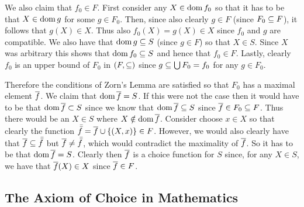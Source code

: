 \begin{questions}
{{      We also claim that $f_0 \in F$.
      First consider any $X \in \dom{f_0}$ so that it has to be that $X \in \dom{g}$ for some $g \in F_0$.
      Then, since also clearly $g \in F$ (since $F_0 \ss F$), it follows that $g(X) \in X$.
      Thus also $f_0(X) = g(X) \in X$ since $f_0$ and $g$ are compatible.
      We also have that $\dom{g} \ss S$ (since $g \in F$) so that $X \in S$.
      Since $X$ was arbitrary this shows that $\dom{f_0} \ss S$ and hence that $f_0 \in F$.
      Lastly, clearly $f_0$ is an upper bound of $F_0$ in $(F, \ss)$ since $g \ss \bigcup F_0 = f_0$ for any $g \in F_0$.

      Therefore the conditions of Zorn's Lemma are satisfied so that $F_0$ has a maximal element $\fb$.
      We claim that $\dom{\fb} = S$.
      If this were not the case then it would have to be that $\dom{\fb} \pss S$ since we know that $\dom{\fb} \ss S$ since $\fb \in F_0 \ss F$.
      Thus there would be an $X \in S$ where $X \notin \dom{\fb}$.
      Consider choose $x \in X$ so that clearly the function $\fbb = \fb \cup \braces{(X, x)} \in F$.
      However, we would also clearly have that $\fb \ss \fbb$ but $\fb \neq \fbb$, which would contradict the maximality of $\fb$.
      So it has to be that $\dom{\fb} = S$.
      Clearly then $\fb$ is a choice function for $S$ since, for any $X \in S$, we have that $\fb(X) \in X$ since $\fb \in F$.
    }
  }

  \subsection{The Axiom of Choice in Mathematics}

\end{questions}

